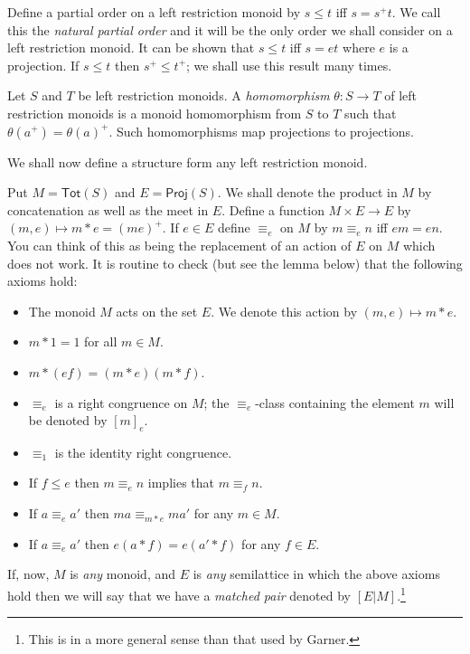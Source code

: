 \documentclass[a4paper]{amsart}
\begin{document}
Define a partial order on a left restriction monoid by $s \leq t$ iff $s = s^{+}t$.
We call this the {\em natural partial order} and it will be the only order we shall consider
on a left restriction monoid.
It can be shown that $s \leq t$ iff $s = et$ where $e$ is a projection.
If $s \leq t$ then $s^{+} \leq t^{+}$;
we shall use this result many times.


Let $S$ and $T$ be left restriction monoids.
A {\em homomorphism} $\theta \colon S \rightarrow T$ of left restriction monoids
is a monoid homomorphism from $S$ to $T$ such that $\theta (a^{+}) = \theta (a)^{+}$.
Such homomorphisms map projections to projections.

We shall now define a structure form any left restriction monoid.

Put $M = \mathsf{Tot}(S)$ and $E = \mathsf{Proj}(S)$.
We shall denote the product in $M$ by concatenation as well as the meet in $E$.
Define a function $M \times E \rightarrow E$ by $(m,e) \mapsto m \ast e = (me)^{+}$.
If $e \in E$ define $\equiv_{e}$ on $M$ by $m \equiv_{e} n$ iff $em = en$.
You can think of this as being the replacement of an action of $E$ on $M$ which does not work.
It is routine to check (but see the lemma below) that the following axioms hold:
\begin{itemize}
\item[{\rm (MP1).}] The monoid $M$ acts on the set $E$. We denote this action by $(m,e) \mapsto m \ast e$.
\item[{\rm (MP2).}] $m \ast 1 = 1$ for all $m \in M$.
\item[{\rm (MP3).}] $m \ast (ef) = (m \ast e)(m \ast f)$.
\item[{\rm (MP4).}] $\equiv_{e}$ is a right congruence on $M$; the $\equiv_{e}$-class containing the element $m$ will be denoted by $[m]_{e}$.
\item[{\rm (MP5).}] $\equiv_{1}$ is the identity right congruence.
\item[{\rm (MP6).}] If $f \leq e$ then $m \equiv_{e} n$ implies that $m \equiv_{f} n$.
\item[{\rm (MP7).}] If $a \equiv_{e} a'$ then $ma \equiv_{m \ast e} ma'$ for any $m \in M$.
\item[{\rm (MP8).}] If $a \equiv_{e} a'$ then $e(a \ast f) = e(a' \ast f)$ for any $f \in E$.
\end{itemize}
If, now,  $M$ is {\em any} monoid, and $E$ is {\em any} semilattice in which the above axioms hold 
then we will say that we have a {\em matched pair} denoted by $[E|M]$.\footnote{This is in a more general sense than that used by Garner.}
\end{document}
